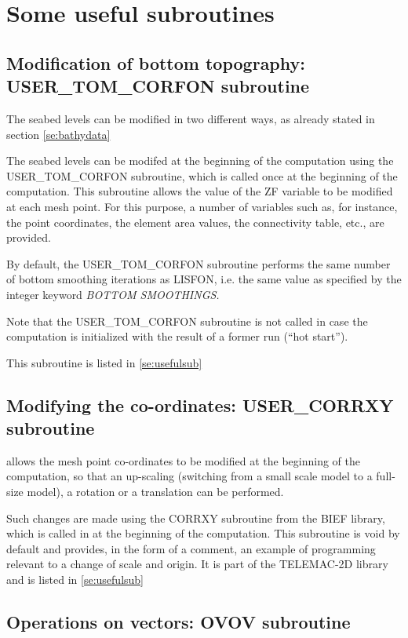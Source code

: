 \section{ Some useful subroutines}


\subsection{ Modification of bottom topography: USER\_TOM\_CORFON subroutine}
\label{se:corfon}
 The seabed levels can be modified in two different ways, as already stated in section \ref{se:bathydata}

 The seabed levels can be modifed at the beginning of the computation using the USER\_TOM\_CORFON subroutine, which is called once at the beginning of the computation. This subroutine allows the value of the ZF variable to be modified at each mesh point. For this purpose, a number of variables such as, for instance, the point coordinates, the element area values, the connectivity table, etc., are provided.

 By default, the USER\_TOM\_CORFON subroutine performs the same number of bottom smoothing iterations as LISFON, i.e. the same value as specified by the integer keyword \textit{BOTTOM SMOOTHINGS.}

 Note that the USER\_TOM\_CORFON subroutine is not called in case the computation is initialized with the result of a former \tomawac run (``hot start'').

 This subroutine is listed in \ref{se:usefulsub}


\subsection{ Modifying the co-ordinates: USER\_CORRXY subroutine }

 \tomawac allows the mesh point co-ordinates to be modified at the beginning of the computation, so that an up-scaling (switching from a small scale model to a full-size model), a rotation or a translation can be performed.

 Such changes are made using the CORRXY subroutine from the BIEF library, which is called in at the beginning of the computation. This subroutine is void by default and provides, in the form of a comment, an example of programming relevant to a change of scale and origin. It is part of the TELEMAC-2D library and is listed in \ref{se:usefulsub}

\subsection{ Operations on vectors: OVOV subroutine }

